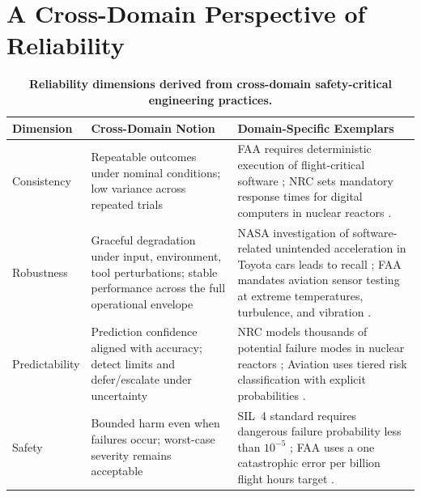 \documentclass[11pt]{article}
\newcounter{dimension}
\begin{document}



\section{A Cross-Domain Perspective of Reliability}
\label{sec:background}

\begin{table}[t]
\centering
\small
\renewcommand{\arraystretch}{1.25}
\setlength{\tabcolsep}{6pt}
\caption{\textbf{Reliability dimensions derived from cross-domain safety-critical engineering practices.}}
\label{tab:cross_domain}
\begin{tabular}{
  >{\raggedright\arraybackslash}p{2.5cm}
  >{\raggedright\arraybackslash}p{5.5cm}
  >{\raggedright\arraybackslash}p{8.5cm}
}
\toprule
\textbf{Dimension} &
\textbf{Cross-Domain Notion} &
\textbf{Domain-Specific Exemplars} \\
\midrule
Consistency &
Repeatable outcomes under nominal conditions; low variance across repeated trials &
FAA requires deterministic execution of flight-critical software \citep{ARP4754A};
NRC sets mandatory response times for digital computers in nuclear reactors \citep{BTP721}. \\
\midrule
Robustness &
Graceful degradation under input, environment, tool perturbations; stable performance across the full operational envelope &
NASA investigation of software-related unintended acceleration in Toyota cars leads to recall \citep{NASA2011Toyota};
FAA mandates aviation sensor testing at extreme temperatures, turbulence, and vibration \citep{AC2116G}. \\
\midrule
Predictability &
Prediction confidence aligned with accuracy; detect limits and defer/escalate under uncertainty &
NRC models thousands of potential failure modes in nuclear reactors \citep{NUREG1150};
Aviation uses tiered risk classification with explicit probabilities \citep{AC251309}. \\
\midrule
Safety &
Bounded harm even when failures occur; worst-case severity remains acceptable&
SIL~4 standard requires dangerous failure probability less than $10^{-5}$ \citep{IEC61508};
FAA uses a one catastrophic error per billion flight hours target \citep{AC251309}. \\
\bottomrule
\end{tabular}
\vspace{-.25cm}
\end{table}
\end{document}
